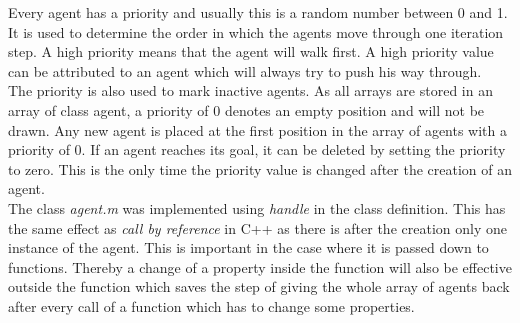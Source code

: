 \noi Every agent has a priority and usually this is a random number between 0 and 1. It is used to determine the order in which the agents move through one iteration step. A high priority means that the agent will walk first. A high priority value can be attributed to an agent which will always try to push his way through.\\
The priority is also used to mark inactive agents. As all arrays are stored in an array of class agent, a priority of 0 denotes an empty position and will not be drawn. Any new agent is placed at the first position in the array of agents with a priority of 0. If an agent reaches its goal, it can be deleted by setting the priority to zero. This is the only time the priority value is changed after the creation of an agent.\\

\noi The class \textit{agent.m} was implemented using \textit{handle} in the class definition. This has the same effect as \textit{call by reference} in C++ as there is after the creation only one instance of the agent. This is important in the case where it is passed down to functions. Thereby a change of a property inside the function will also be effective outside the function which saves the step of giving the whole array of agents back after every call of a function which has to change some properties.


